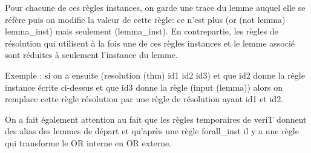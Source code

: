 \documentclass{article}
\begin{document}
Pour chacune de ces règles instances, on garde une trace du lemme auquel elle se réfère puis on modifie la valeur
de cette règle: ce n'est plus (or (not lemma) lemma\_inst) mais seulement (lemma\_inst). En contrepartie, les règles
de résolution qui utilisent à la fois une de ces règles instances et le lemme associé sont réduites à seulement
l'instance du lemme.

Exemple :
si on a ensuite
(resolution (thm) id1 id2 id3)
et que id2 donne la règle instance écrite ci-dessus et que id3 donne la règle
(input (lemma))
alors on remplace cette règle résolution par une règle de résolution ayant id1 et id2.

On a fait également attention au fait que les règles temporaires de veriT donnent des alias des lemmes de départ
et qu'après une règle forall\_inst il y a une règle qui transforme le OR interne en OR externe.

\renewcommand\refname{Bibliographie}
\nocite{*}
{}

\end{document}
